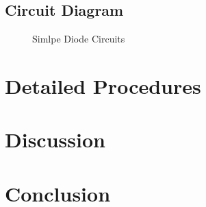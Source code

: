     \subsection{Circuit Diagram}
    \begin{figure}[h]

        \begin{minipage}[h]{0.47\linewidth}
        \begin{center}
             
            \label{Lab1a}
            \end{center} 
        \end{minipage}
    \hfill
    \vspace{0.2 cm}
        \begin{minipage}[h]{0.47\linewidth}
        \begin{center}
             
            \label{Lab1b}
            \end{center}
        \end{minipage}
    \vfill
    \vspace{0.2 cm}
        \begin{minipage}[h]{0.47\linewidth}
        \begin{center}
             
            \label{Lab1c}
            \end{center}
        \end{minipage}
    \hfill
        \begin{minipage}[h]{0.47\linewidth}
        \begin{center}
             
            \label{Lab1d}
        \end{center}
        \end{minipage}
    \caption{Simlpe Diode Circuits}
    \label{SDC}

    \end{figure}
\FloatBarrier

\section{Detailed Procedures}


\section{Discussion}


\section{Conclusion}

